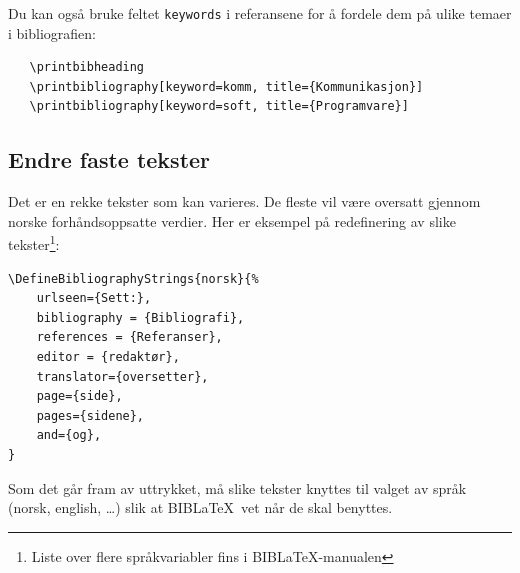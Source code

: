 \documentclass[11pt,norsk,a4paper]{article}
\newcommand{\blt}{B{\smaller[2]IB}\discretionary{-}{}{\kern
    -0.12em}\LaTeX{}}
\begin{document}
Du kan også bruke feltet \verb=keywords= i referansene for å fordele dem på ulike temaer i bibliografien:

{\footnotesize\begin{verbatim}
   \printbibheading
   \printbibliography[keyword=komm, title={Kommunikasjon}]
   \printbibliography[keyword=soft, title={Programvare}]
\end{verbatim}}

\subsection{Endre faste tekster}\label{tekster}
Det er en rekke tekster som kan varieres. De fleste vil være oversatt
gjennom norske forhåndsoppsatte verdier. Her er eksempel på
redefinering av slike tekster\footnote{Liste over flere språkvariabler
  fins i \blt-manualen\cite[][se under avsnitt 4.9, s. 215]{biblatex}}:

{\footnotesize\begin{verbatim}
\DefineBibliographyStrings{norsk}{%
    urlseen={Sett:},
    bibliography = {Bibliografi},
    references = {Referanser},
    editor = {redaktør},
    translator={oversetter},
    page={side},
    pages={sidene},
    and={og},
}
\end{verbatim}}
\noindent{}Som det går fram av uttrykket, må slike tekster knyttes til valget av
språk (norsk, english, \ldots) slik at \blt\ vet når de skal benyttes.
\end{document}
